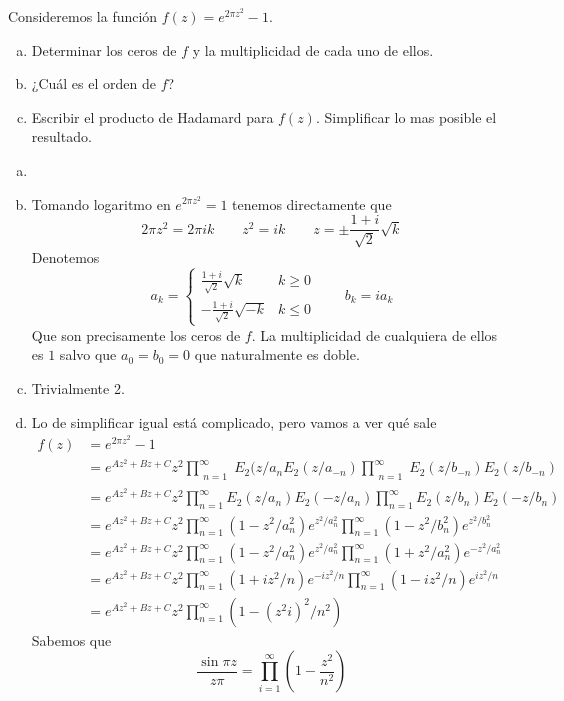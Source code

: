 \documentclass[twoside]{article}
\begin{document}
\newpage
\begin{ejercicio}{4}
Consideremos la función $f(z)=e^{2\pi z^2}-1$.
\begin{enumerate}[a)]
\item Determinar los ceros de $f$ y la multiplicidad de cada uno de ellos. 
\item ¿Cuál es el orden de $f$?
\item Escribir el producto de Hadamard para $f(z)$.  Simplificar lo mas posible el resultado. 
\end{enumerate}
\end{ejercicio}
\begin{solucion}
\begin{enumerate}[a)]
\item[]
\item Tomando logaritmo en $e^{2\pi z^2} = 1$ tenemos directamente que
$$
2\pi z^2 = 2\pi i k \qquad z^2 = ik \qquad z = \pm \frac{1+i}{\sqrt{2}}\sqrt{k} 
$$
Denotemos
$$
a_k = \begin{cases}
\frac{1+i}{\sqrt{2}}\sqrt{k} & k\geq 0\\
-\frac{1+i}{\sqrt{2}}\sqrt{-k} & k\leq 0
\end{cases}
\qquad
b_k = ia_k
$$
Que son precisamente los ceros de $f$. La multiplicidad de cualquiera de ellos es $1$ salvo que $a_0=b_0=0$ que naturalmente es doble. 
\item Trivialmente 2.
\item Lo de simplificar igual está complicado, pero vamos a ver qué sale
\begin{align*}
f(z) & = e^{2\pi z^2}-1\\
&= e^{Az^2+Bz+C}z^2\prod_{\substack{n=1}}^\infty E_2(z/a_{n}E_2(z/a_{-n})\prod_{\substack{n=1}}^\infty E_2(z/b_{-n})E_2(z/b_{-n})\\
&= e^{Az^2+Bz+C}z^2\prod_{n=1}^\infty E_2(z/a_n)E_2(-z/a_{n})\prod_{n=1}^\infty E_2(z/b_n)E_2(-z/b_n)\\
&= e^{Az^2+Bz+C}z^2\prod_{n=1}^\infty (1-z^2/a_n^2)e^{z^2/a_n^2}\prod_{n=1}^\infty  (1-z^2/b_n^2)e^{z^2/b_n^2}\\
&= e^{Az^2+Bz+C}z^2\prod_{n=1}^\infty (1-z^2/a_n^2)e^{z^2/a_n^2}\prod_{n=1}^\infty  (1+z^2/a_n^2)e^{-z^2/a_n^2}\\
&= e^{Az^2+Bz+C}z^2\prod_{n=1}^\infty (1+iz^2/n)e^{-iz^2/n}\prod_{n=1}^\infty  (1-iz^2/n)e^{iz^2/n}\\
&= e^{Az^2+Bz+C}z^2\prod_{n=1}^\infty (1-(z^2i)^2/n^2)
\end{align*}
Sabemos que 
$$
\frac{\sin \pi z}{z\pi} =\prod_{i=1}^\infty\left(1-\frac{z^2}{n^2}\right)
$$
\end{enumerate}
\end{solucion}
\end{document}
